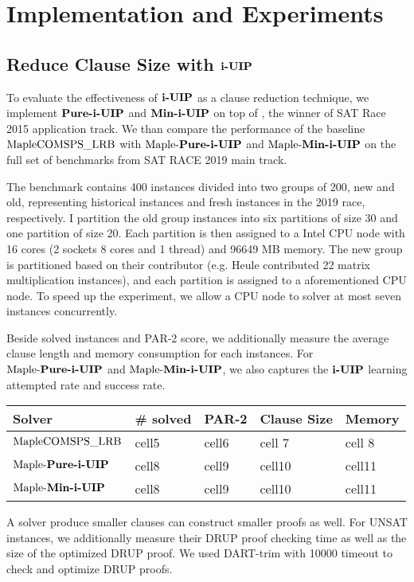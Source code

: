 \section{Implementation and Experiments}

\subsection{Reduce Clause Size with $\textbf{i-UIP}$}
To evaluate the effectiveness of $\textbf{i-UIP}$ as a clause reduction technique, we implement  $\textbf{Pure-i-UIP}$ and $\textbf{Min-i-UIP}$  on top of \text{\MapleBase} \cite{}, the winner of SAT Race 2015 application track.  We than compare the performance of the baseline $\text{MapleCOMSPS\_LRB}$ with $\text{Maple-\textbf{Pure-i-UIP}}$ and $\text{Maple-\textbf{Min-i-UIP}}$ on the full set of benchmarks from SAT RACE 2019 main track.

The benchmark contains 400 instances divided into two groups of 200, new and old, representing historical instances and fresh instances in the 2019 race, respectively. I partition the old group instances into six partitions of size 30 and one partition of size 20. Each partition is then assigned to a Intel CPU node with 16 cores (2 sockets 8 cores  and  1 thread) and 96649 MB memory. The new group is partitioned based on their contributor (e.g. Heule contributed 22 matrix multiplication instances), and each partition is assigned to a aforementioned CPU node. To speed up the experiment, we allow a CPU node to solver at most seven instances concurrently. 

Beside solved instances and PAR-2 score, we additionally measure the average clause length and memory consumption for each instances. For $\text{Maple-\textbf{Pure-i-UIP}}$  and $\text{Maple-\textbf{Min-i-UIP}}$, we also captures the $\textbf{i-UIP}$ learning attempted rate and success rate.





\begin{center}
\begin{tabular}{ | m{4cm} | m{2cm}| m{2cm} | m{2cm} | m{2cm} | } 
\hline
Solver & \# solved & PAR-2 & Clause Size & Memory \\ 
\hline
$\text{MapleCOMSPS\_LRB}$ & cell5 & cell6 & cell 7 & cell 8 \\ 
\hline
$\text{Maple-\textbf{Pure-i-UIP}}$ & cell8 & cell9 & cell10 & cell11\\ 
\hline
$\text{Maple-\textbf{Min-i-UIP}}$ & cell8 & cell9 & cell10 & cell11\\ 
\hline
\end{tabular}
\end{center}

A solver produce smaller clauses can construct smaller proofs as well. For UNSAT instances, we additionally measure their DRUP\cite{} proof checking time as well as the size of the optimized DRUP proof. We used DART-trim \cite{} with 10000 timeout to check and optimize DRUP proofs. 





